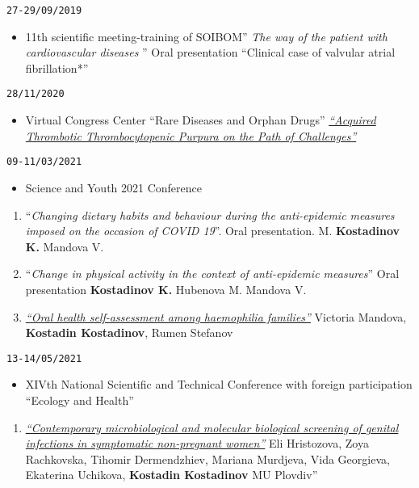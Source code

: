 \documentclass[
  12pt,
  letterpaper,
  DIV=11,
  numbers=noendperiod]{scrartcl}
\providecommand{\tightlist}{%
  \setlength{\itemsep}{0pt}\setlength{\parskip}{0pt}}\usepackage{longtable,booktabs,array}
\begin{document}
\texttt{27-29/09/2019}

\begin{itemize}
\tightlist
\item
  11th scientific meeting-training of SOIBOM'' \textbar{} \emph{The way
  of the patient with cardiovascular diseases }'' Oral presentation
  ``Clinical case of valvular atrial fibrillation*''
\end{itemize}

\texttt{28/11/2020}

\begin{itemize}
\tightlist
\item
  Virtual Congress Center ``Rare Diseases and Orphan Drugs'' \textbar{}
  \emph{\href{https://youtu.be/R_UbvDcyTxs}{``Acquired Thrombotic
  Thrombocytopenic Purpura on the Path of Challenges''}}
\end{itemize}

\texttt{09-11/03/2021}

\begin{itemize}
\tightlist
\item
  Science and Youth 2021 Conference
\end{itemize}

\begin{enumerate}
\def\labelenumi{\arabic{enumi}.}
\item
  ``\emph{Changing dietary habits and behaviour during the anti-epidemic
  measures imposed on the occasion of COVID 19}''. \textbar{} Oral
  presentation. \textbar{} M. \textbf{Kostadinov K.} Mandova V.
\item
  ``\emph{Change in physical activity in the context of anti-epidemic
  measures}'' \textbar{} Oral presentation \textbar{} \textbf{Kostadinov
  K.} Hubenova M. Mandova V.
\item
  \emph{\href{https://asclepius.bg/cnm/wp-content/uploads/2022/05/Sbornik-Nauka-i-Mladost-2021.pdf}{``Oral
  health self-assessment among haemophilia families''}} \textbar{}
  Victoria Mandova, \textbf{Kostadin Kostadinov}, Rumen Stefanov
\end{enumerate}

\texttt{13-14/05/2021}

\begin{itemize}
\tightlist
\item
  XIVth National Scientific and Technical Conference with foreign
  participation ``Ecology and Health''
\end{itemize}

\begin{enumerate}
\def\labelenumi{\arabic{enumi}.}
\tightlist
\item
  \emph{\href{https://hst.bg/ECOLOGY\%20AND\%20HEALTH\%202021.pdf}{``Contemporary
  microbiological and molecular biological screening of genital
  infections in symptomatic non-pregnant women''}} \textbar{} Eli
  Hristozova, Zoya Rachkovska, Tihomir Dermendzhiev, Mariana Murdjeva,
  Vida Georgieva, Ekaterina Uchikova, \textbf{Kostadin Kostadinov}
  \textbar{} MU Plovdiv''
\end{enumerate}
\end{document}
